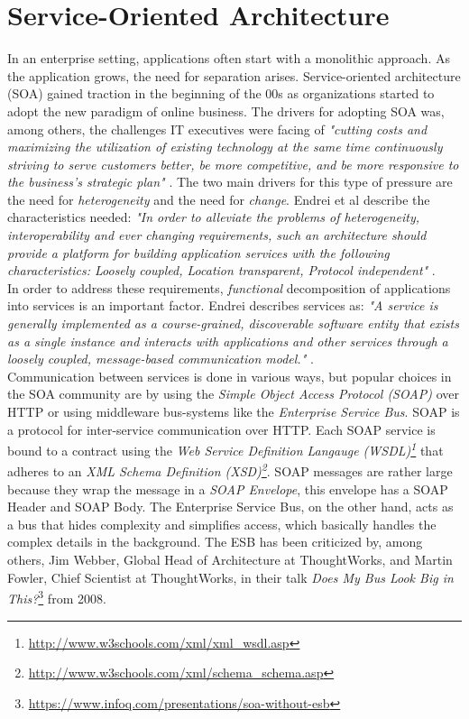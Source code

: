 \section{Service-Oriented Architecture}
In an enterprise setting, applications often start with a monolithic approach. As the application grows, the need for separation arises. Service-oriented architecture (SOA) gained traction in the beginning of the 00s as organizations started to adopt the new paradigm of online business. The drivers for adopting SOA was, among others, the challenges IT executives were facing of \textit{"cutting costs and maximizing the utilization of existing technology at the same time continuously striving to serve customers better, be more competitive, and be more responsive to the business's strategic plan"} \cite[p. 18]{endrei2004patterns}. The two main drivers for this type of pressure are the need for \textit{heterogeneity} and the need for \textit{change}. 
Endrei et al describe the characteristics needed: \textit{"In order to alleviate the problems of heterogeneity, interoperability and ever changing requirements, such an architecture should provide a platform for building application services with the following characteristics: Loosely coupled, Location transparent, Protocol independent"}
 \cite[p. 19]{endrei2004patterns}. \\


\noindent In order to address these requirements, \textit{functional} decomposition of applications into services is an important factor. Endrei describes services as:  \textit{"A service is generally implemented as a course-grained, discoverable software entity that exists as a single instance and interacts with applications and other services through a loosely coupled, message-based communication model."} \cite[p. 21]{endrei2004patterns}. \\


\noindent 
Communication between services is done in various ways, but popular choices in the SOA community are by using the \textit{Simple Object Access Protocol (SOAP)} over HTTP or using middleware bus-systems like the \textit{Enterprise Service Bus}. SOAP is a protocol for inter-service communication over HTTP. Each SOAP service is bound to a contract using the \textit{Web Service Definition Langauge (WSDL)\footnote{\url{http://www.w3schools.com/xml/xml_wsdl.asp}}} that adheres to an \textit{XML Schema Definition (XSD)\footnote{\url{http://www.w3schools.com/xml/schema_schema.asp}}}. SOAP messages are rather large because they wrap the message in a \textit{SOAP Envelope}, this envelope has a SOAP Header and SOAP Body. The Enterprise Service Bus, on the other hand, acts as a bus that hides complexity and simplifies access, which basically handles the complex details in the background.
The ESB has been criticized by, among others, Jim Webber, Global Head of Architecture at ThoughtWorks, and Martin Fowler, Chief Scientist at ThoughtWorks, in their talk \textit{Does My Bus Look Big in This?}\footnote{\url{https://www.infoq.com/presentations/soa-without-esb}} from 2008. 

